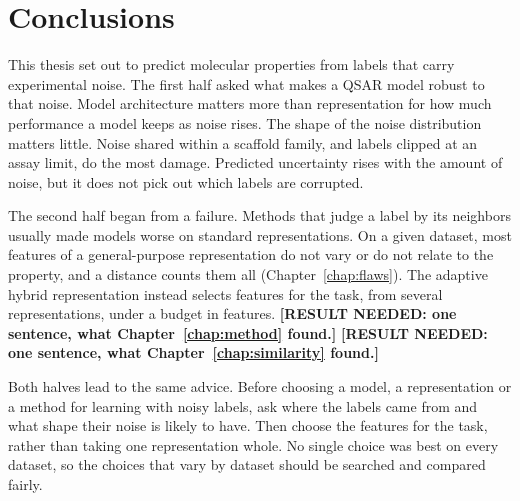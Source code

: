 \section{Conclusions}\label{sec:discussion:conclusions}

This thesis set out to predict molecular properties from labels that carry experimental noise. The first half asked what makes a QSAR model robust to that noise. Model architecture matters more than representation for how much performance a model keeps as noise rises. The shape of the noise distribution matters little. Noise shared within a scaffold family, and labels clipped at an assay limit, do the most damage. Predicted uncertainty rises with the amount of noise, but it does not pick out which labels are corrupted.

The second half began from a failure. Methods that judge a label by its neighbors usually made models worse on standard representations. On a given dataset, most features of a general-purpose representation do not vary or do not relate to the property, and a distance counts them all (Chapter~\ref{chap:flaws}). The adaptive hybrid representation instead selects features for the task, from several representations, under a budget in features. \textbf{[RESULT NEEDED: one sentence, what Chapter~\ref{chap:method} found.]} \textbf{[RESULT NEEDED: one sentence, what Chapter~\ref{chap:similarity} found.]}

Both halves lead to the same advice. Before choosing a model, a representation or a method for learning with noisy labels, ask where the labels came from and what shape their noise is likely to have. Then choose the features for the task, rather than taking one representation whole. No single choice was best on every dataset, so the choices that vary by dataset should be searched and compared fairly.

